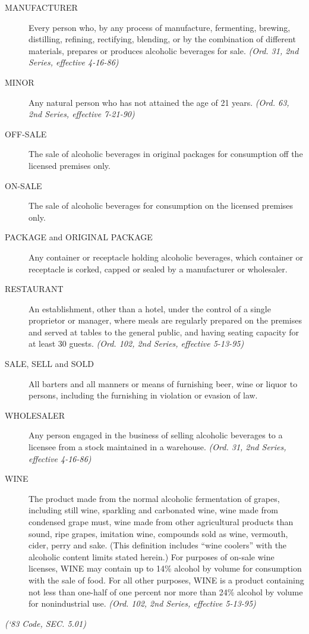\begin{description}
    \item[MANUFACTURER] Every person who, by any process of manufacture, fermenting, brewing, distilling, refining, rectifying, blending, or by the combination of different materials, prepares or produces alcoholic beverages for sale. \emph{(Ord. 31, 2nd Series, effective 4-16-86)}
    \item[MINOR] Any natural person who has not attained the age of 21 years. \emph{(Ord. 63, 2nd Series, effective 7-21-90)}
    \item[OFF-SALE] The sale of alcoholic beverages in original packages for consumption off the licensed premises only.
    \item[ON-SALE] The sale of alcoholic beverages for consumption on the licensed premises only.\
    \item[PACKAGE and ORIGINAL PACKAGE] Any container or receptacle holding alcoholic beverages, which container or receptacle is corked, capped or sealed by a manufacturer or wholesaler.
    \item[RESTAURANT] An establishment, other than a hotel, under the control of a single proprietor or manager, where meals are regularly prepared on the premises and served at tables to the general public, and having seating capacity for at least 30 guests. \emph{(Ord. 102, 2nd Series, effective 5-13-95)}
    \item[SALE, SELL and SOLD] All barters and all manners or means of furnishing beer, wine or liquor to persons, including the furnishing in violation or evasion of law.
    \item[WHOLESALER] Any person engaged in the business of selling alcoholic beverages to a licensee from a stock maintained in a warehouse. \emph{(Ord. 31, 2nd Series, effective 4-16-86)}
    \item[WINE] The product made from the normal alcoholic fermentation of grapes, including still wine, sparkling and carbonated wine, wine made from condensed grape must, wine made from other agricultural products than sound, ripe grapes, imitation wine, compounds sold as wine, vermouth, cider, perry and sake. (This definition includes “wine coolers” with the alcoholic content limits stated herein.) For purposes of on-sale wine licenses, WINE may contain up to 14\% alcohol by volume for consumption with the sale of food.  For all other purposes, WINE is a product containing not less than one-half of one percent nor more than 24\% alcohol by volume for nonindustrial use. \emph{(Ord. 102, 2nd Series, effective 5-13-95)}
\end{description}
\emph{(‘83 Code, SEC. 5.01)}

